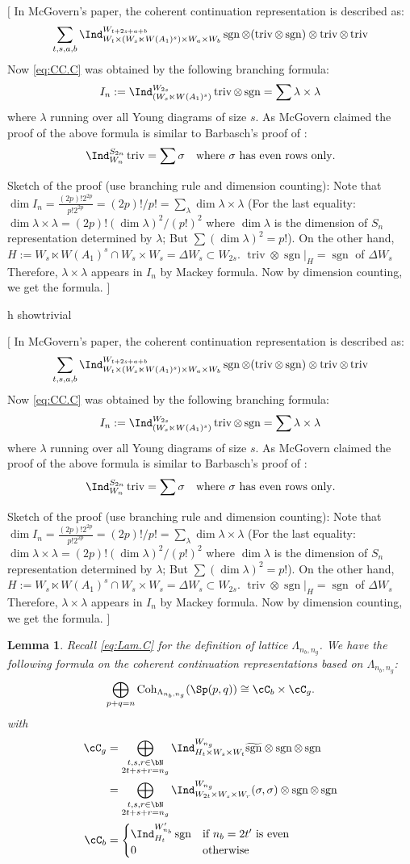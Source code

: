 \documentclass[12pt,a4paper]{amsart}
\newcommand{\trivial}[2][]{\if\relax\detokenize{#1}\relax
  {%
      \color{orange} \vspace{0em} $[$  #2 $]$
      \color{black}
  }
  \else
\ifx#1h
\ifcsname showtrivial\endcsname
{%
    \color{orange} \vspace{0em}  $[$ #2 $]$
    \color{black}
}
\fi
\else {\red Wrong argument!} \fi
\fi
}
\newcommand{\sgn}{\operatorname{sgn}}
\newcommand{\triv}{\operatorname{triv}}
\numberwithin{equation}{section}
\newtheorem{lem}[thm]{Lemma}
\theoremstyle{remark}
\def\lamck{\lambda_\ckcO}
\def\Cint#1{\Coh_{[#1]}}
\def\Coh{\mathrm{Coh}}
\def\hsgn{\widetilde{\mathrm{sgn}}}
\begin{document}
\trivial{ In McGovern's paper, the coherent continuation representation is
  described as:
  \[
    \sum_{t,s,a,b}\Ind_{W_t\times (W_s\ltimes W(A_1)^s)\times W_a\times W_b}^{W_{t+2s+a+b}} \sgn\otimes (\triv \otimes \sgn)\otimes \triv\otimes \triv
  \]
  Now \eqref{eq:CC.C} was obtained by the following branching formula:
  \cite[p220 (6)]{Mc}
  \[
    I_n:= \Ind_{(W_s\ltimes W(A_1)^s)}^{W_{2s}}\triv\otimes \sgn = \sum \lambda\times \lambda
  \]
  where $\lambda$ running over all Young diagrams of size $s$. As McGovern
  claimed the proof of the above formula is similar to Barbasch's proof of
  \cite[Lemma~4.1]{B.W}:
  \[
    \Ind_{W_n}^{S_{2n}} \triv = \sum \sigma \quad \text{where $\sigma$ has even
      rows only}.
  \]

  Sketch of the proof (use branching rule and dimension counting): Note that
  $\dim I_n = \frac{(2p)! 2^{2p}}{p! 2^{2p}} = (2p)!/p! =\sum_\lambda \dim \lambda\times \lambda$
  (For the last equality:
  $\dim \lambda\times \lambda = (2p)! (\dim \lambda)^2/(p!)^2$ where
  $\dim \lambda$ is the dimension of $S_n$ representation determined by
  $\lambda$; But $\sum (\dim \lambda)^2 = p!$). On the other hand,
  $H :=W_s\ltimes W(A_1)^s\cap W_s\times W_s = \Delta W_s \subset W_{2s}$.
  $\triv \otimes \sgn|_H = \sgn$ of $\Delta W_s$ Therefore,
  $\lambda\times \lambda$ appears in $I_n$ by Mackey formula. Now by dimension
  counting, we get the formula. }



\begin{lem}
  Recall \eqref{eq:Lam.C} for the definition of lattice $\Lambda_{n_{b},n_{g}}$.
  We have the following formula on the coherent continuation
  representations based on $\Lambda_{n_{b},n_{g}}$:
  \[
    \bigoplus_{p+q=n} \Coh_{\Lambda_{n_{b}, n_{g}}}(\Sp(p,q)) \cong \cC_{b}\times \cC_{g}.
  \]
  with
  \[
    \begin{split}
      \cC_g %
      &=\bigoplus_{\substack{t,s,r\in\bN\\2t+s+r=n_{g}}} \Ind_{H_{t} \times W_s\times W_t}^{W_{n_{g}}}
       \hsgn \otimes \sgn \otimes \sgn \\
      & =\bigoplus_{\substack{t,s,r\in\bN\\2t+s+r=n_{g}}} \Ind_{W_{2t}\times W_s\times W_r}^{W_{n_{g}}}
      (\sigma,\sigma)\otimes \sgn \otimes \sgn \\
      \cC_b & =
      \begin{cases}
        \Ind_{H_{t}}^{W'_{n_{b}}} \sgn &
        \text{if $n_{b}=2t'$ is even} \\
        0 & \text{otherwise}\\
      \end{cases}\\
    \end{split}
  \]
\end{lem}
\end{document}
